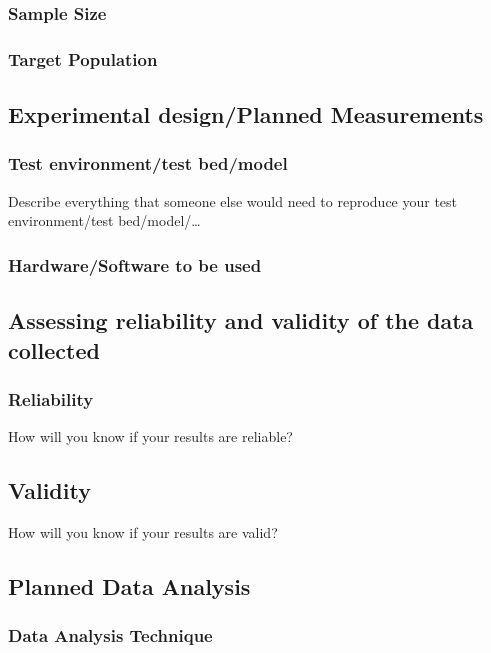 \documentclass[a4paper,10pt,twocolumn]{article}
\numberwithin{figure}{section}
\numberwithin{table}{section}
\begin{document}
\subsubsection{Sample Size}

\subsubsection{Target Population}


\subsection{Experimental design/Planned Measurements}


\subsubsection{Test environment/test bed/model}
Describe everything that someone else would need to reproduce your test environment/test
bed/model/…

\subsubsection{Hardware/Software to be used}


\subsection{Assessing reliability and validity of the data collected}

\subsubsection{Reliability}
How will you know if your results are reliable?

\subsection{Validity}
How will you know if your results are valid?



\subsection{Planned Data Analysis}

\subsubsection{Data Analysis Technique}
\end{document}
